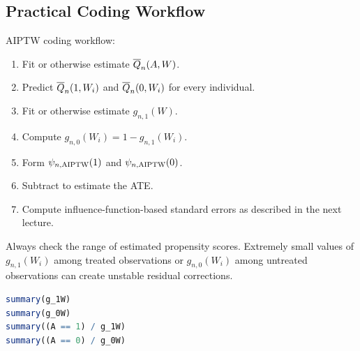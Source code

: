 \subsection{Practical Coding Workflow}

\begin{estimationbox}
AIPTW coding workflow:
\begin{enumerate}
\item Fit or otherwise estimate $\overline{Q}_n(A,W)$.
\item Predict $\overline{Q}_n(1,W_i)$ and $\overline{Q}_n(0,W_i)$ for every individual.
\item Fit or otherwise estimate $g_{n,1}(W)$.
\item Compute $g_{n,0}(W_i)=1-g_{n,1}(W_i)$.
\item Form $\psi_{n,\operatorname{AIPTW}}(1)$ and $\psi_{n,\operatorname{AIPTW}}(0)$.
\item Subtract to estimate the ATE.
\item Compute influence-function-based standard errors as described in the next
lecture.
\end{enumerate}
\end{estimationbox}

Always check the range of estimated propensity scores. Extremely small values of
$g_{n,1}(W_i)$ among treated observations or $g_{n,0}(W_i)$ among untreated
observations can create unstable residual corrections.

\begin{implementationbox}
\begin{lstlisting}[language=R]
summary(g_1W)
summary(g_0W)
summary((A == 1) / g_1W)
summary((A == 0) / g_0W)
\end{lstlisting}
\end{implementationbox}
